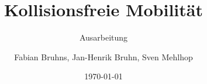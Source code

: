 \documentclass[a4paper,titlepage]{scrartcl}
\begin{document}
	
	\title{Kollisionsfreie Mobilität}
	\subtitle{Ausarbeitung}
	\author{Fabian Bruhns, Jan-Henrik Bruhn, Sven Mehlhop} 
	\date{\today} 
	\maketitle
	\tableofcontents
	\newpage
	
	
	
	
	
	\newpage
	
\end{document}
